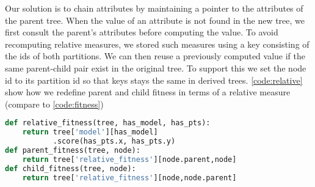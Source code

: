 Our solution is to chain attributes by maintaining a pointer to the attributes of the parent tree. When the value of an attribute is not found in the new tree, we first consult the parent's attributes before computing the value. To avoid recomputing relative measures, we stored such measures using a key consisting of the ids of both partitions. We can then reuse a previously computed value if the same parent-child pair exist in the original tree. To support this we set the node id to its partition id so that keys stays the same in derived trees. \autoref{code:relative} show how we redefine parent and child fitness in terms of a relative measure (compare to \autoref{code:fitness})

\begin{lstlisting}[language=Python, basicstyle=\footnotesize,
    caption=Chained attributes. Parent/child relation depends on the current tree structure, 
    float=tb, 
    breaklines=false,
    label=code:relative]
def relative_fitness(tree, has_model, has_pts):
    return tree['model'][has_model]
           .score(has_pts.x, has_pts.y)
def parent_fitness(tree, node):
    return tree['relative_fitness'][node.parent,node]
def child_fitness(tree, node):
    return tree['relative_fitness'][node,node.parent]    
\end{lstlisting}
